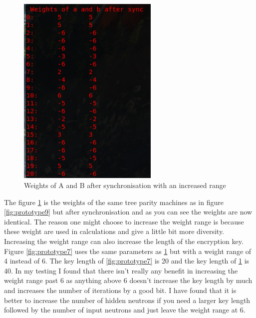 \begin{figure}[!h]
  \centering
      \includegraphics[width=0.6\textwidth]{Figures/proto10.png}
  \caption[Weights of A and B after synchronisation with an increased range]{Weights of A and B after synchronisation with an increased range}
  \label{fig:prototype10}
\end{figure}
\FloatBarrier
The figure \ref{fig:prototype10} is the weights of the same tree parity machines as in figure \ref{fig:prototype9} but after synchronisation and as you can see the weights are now identical. 
The reason one might choose to increase the weight range is because these weight are used in calculations and give a little bit more diversity. 
Increasing the weight range can also increase the length of the encryption key. Figure \ref{fig:prototype7} uses the same parameters as \ref{fig:prototype10} but with a weight range of 4 instead of 6. The key length of \ref{fig:prototype7} is 20 and the key length of \ref{fig:prototype10} is 40.
In my testing I found that there isn't really any benefit in increasing the weight range past 6 as anything above 6 doesn't increase the key length by much and increases the number of iterations by a good bit. I have found that it is better to increase the number of hidden neutrons if you need a larger key length followed by the number of input neutrons and just leave the weight range at 6.





